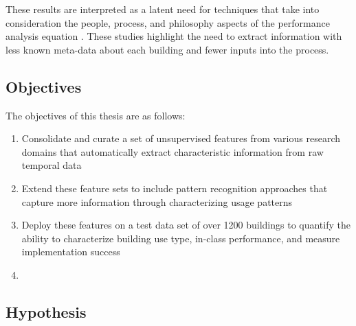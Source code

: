 
These results are interpreted as a latent need for techniques that take into consideration the people, process, and philosophy aspects of the performance analysis equation \cite{Miller:2013vk}. These studies highlight the need to extract information with less known meta-data about each building and fewer inputs into the process.


\subsection{Objectives}
The objectives of this thesis are as follows:
\begin{enumerate}
\item Consolidate and curate a set of unsupervised features from various research domains that automatically extract characteristic information from raw temporal data
\item Extend these feature sets to include pattern recognition approaches that capture more information through characterizing usage patterns
\item Deploy these features on a test data set of over 1200 buildings to quantify the ability to characterize building use type, in-class performance, and measure implementation success
\item 
\end{enumerate}


\subsection{Hypothesis}